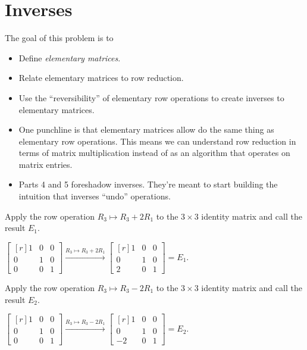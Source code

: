 \documentclass{problemset}
\newcommand{\mat}[1]{\begin{bmatrix*}[r]#1\end{bmatrix*}}
\begin{document}
\section*{Inverses}

	\question
	\begin{annotation}
		\begin{goals}

			The goal of this problem is to
			\begin{itemize}
				\item Define \emph{elementary matrices}.
				\item Relate elementary matrices to row reduction.
				\item Use the ``reversibility'' of elementary row
					operations to create inverses to elementary matrices.
			\end{itemize}
		\end{goals}

		\begin{notes}
			\begin{itemize}
				\item One punchline is that elementary matrices
					allow do the same thing as elementary row
					operations. This means we can understand row
					reduction in terms of matrix multiplication instead
					of as an algorithm that operates on matrix entries.
				\item Parts 4 and 5 foreshadow inverses. They're meant to start
					building the intuition that inverses ``undo'' operations.
			\end{itemize}
		\end{notes}
	\end{annotation}
	\begin{parts}
		\item Apply the row operation $R_3\mapsto R_3+2R_1$ to the $3\times 3$ identity
		matrix and call the result $E_1$.
			\begin{solution}
				$\mat{1&0&0\\0&1&0\\0&0&1} \xrightarrow{R_3\mapsto R_3+2R_1} \mat{1&0&0\\0&1&0\\2&0&1}=E_1$.
			\end{solution}
		\item Apply the row operation $R_3\mapsto R_3-2R_1$ to the $3\times 3$ identity
		matrix and call the result $E_2$.
			\begin{solution}
				$\mat{1&0&0\\0&1&0\\0&0&1} \xrightarrow{R_3\mapsto R_3-2R_1} \mat{1&0&0\\0&1&0\\-2&0&1}=E_2$.
			\end{solution}
	\end{parts}
\end{document}
